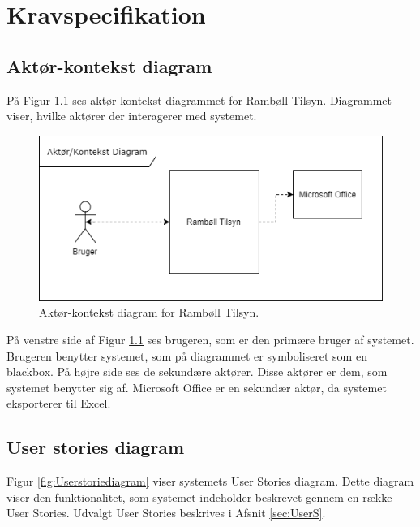	\chapter{Kravspecifikation}
	
	\section{Aktør-kontekst diagram}
		På Figur \ref{fig:AktorKontekst} ses aktør kontekst diagrammet for Rambøll Tilsyn. Diagrammet viser, hvilke aktører der interagerer med systemet.
	\begin{figure}[H]
		\centering
		\includegraphics[width=0.6\linewidth]{Kravspecifikation/AktorDiagram}
		\caption{Aktør-kontekst diagram for Rambøll Tilsyn.}
		\label{fig:AktorKontekst}
	\end{figure}

	På venstre side af Figur \ref{fig:AktorKontekst} ses brugeren, som er den primære bruger af systemet. Brugeren benytter systemet, som på diagrammet er symboliseret som en blackbox. På højre side ses de sekundære aktører. Disse aktører er dem, som systemet benytter sig af. Microsoft Office er en sekundær aktør, da systemet eksporterer til Excel.
	
	\clearpage
	
\section{User stories diagram}
	Figur \ref{fig:Userstoriediagram} viser systemets User Stories diagram. Dette diagram viser den funktionalitet, som systemet indeholder beskrevet gennem en række User Stories. Udvalgt User Stories beskrives i Afsnit \ref{sec:UserS}.
	
